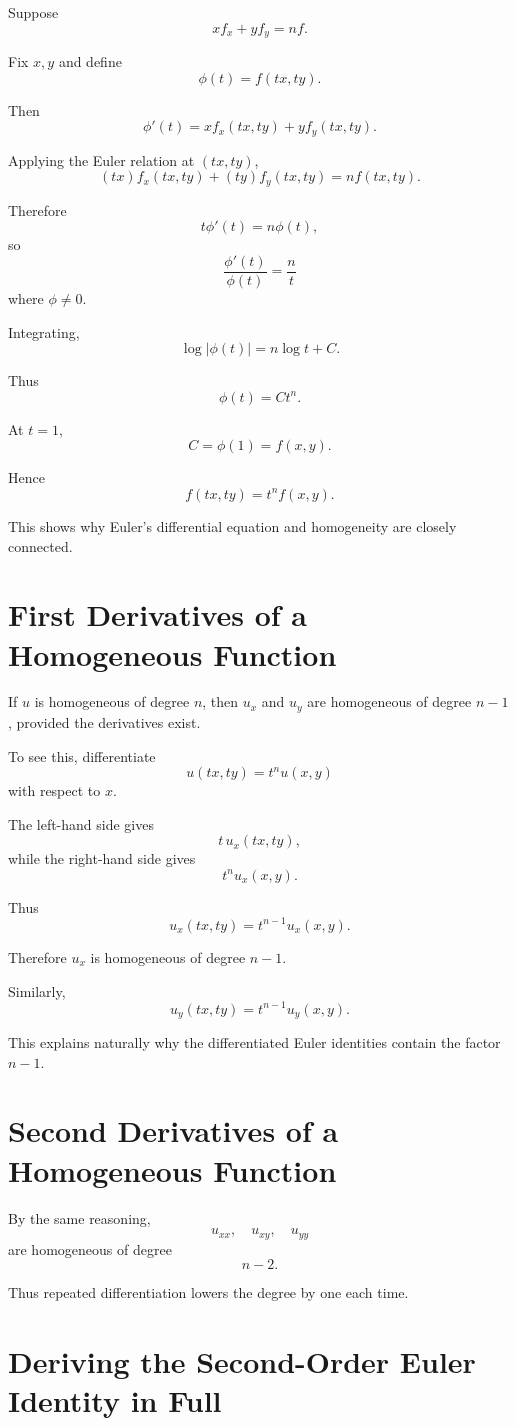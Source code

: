 \documentclass[11pt,oneside]{book}
\theoremstyle{studentthm}
\theoremstyle{definition}
\begin{document}
Suppose
\[
xf_x+yf_y=nf.
\]

Fix \(x,y\) and define
\[
\phi(t)=f(tx,ty).
\]

Then
\[
\phi'(t)
=
x f_x(tx,ty)+y f_y(tx,ty).
\]

Applying the Euler relation at \((tx,ty)\),
\[
(tx)f_x(tx,ty)
+
(ty)f_y(tx,ty)
=
n f(tx,ty).
\]

Therefore
\[
t\phi'(t)=n\phi(t),
\]
so
\[
\frac{\phi'(t)}{\phi(t)}
=
\frac nt
\]
where \(\phi\ne0\).

Integrating,
\[
\log|\phi(t)|
=
n\log t+C.
\]

Thus
\[
\phi(t)=Ct^n.
\]

At \(t=1\),
\[
C=\phi(1)=f(x,y).
\]

Hence
\[
f(tx,ty)=t^nf(x,y).
\]

This shows why Euler's differential equation and homogeneity are
closely connected.

\section{First Derivatives of a Homogeneous Function}

If \(u\) is homogeneous of degree \(n\), then \(u_x\) and \(u_y\) are
homogeneous of degree \(n-1\), provided the derivatives exist.

To see this, differentiate
\[
u(tx,ty)=t^nu(x,y)
\]
with respect to \(x\).

The left-hand side gives
\[
t\,u_x(tx,ty),
\]
while the right-hand side gives
\[
t^nu_x(x,y).
\]

Thus
\[
u_x(tx,ty)
=
t^{n-1}u_x(x,y).
\]

Therefore \(u_x\) is homogeneous of degree \(n-1\).

Similarly,
\[
u_y(tx,ty)
=
t^{n-1}u_y(x,y).
\]

This explains naturally why the differentiated Euler identities contain
the factor \(n-1\).

\section{Second Derivatives of a Homogeneous Function}

By the same reasoning,
\[
u_{xx},\quad u_{xy},\quad u_{yy}
\]
are homogeneous of degree
\[
n-2.
\]

Thus repeated differentiation lowers the degree by one each time.

\section{Deriving the Second-Order Euler Identity in Full}
\end{document}
